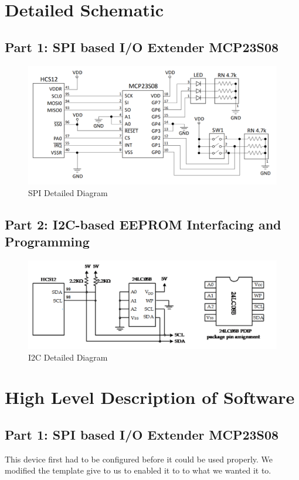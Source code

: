 \documentclass{article}
\begin{document}
	\section*{Detailed Schematic}
	\subsection*{Part 1: SPI based I/O Extender MCP23S08}
	\begin{figure}[H]
		\centering
		\includegraphics[scale=0.75]{SPI_SCH}
		\caption{SPI Detailed Diagram}
	\end{figure}
	\subsection*{Part 2: I2C-based EEPROM Interfacing and Programming}
	\begin{figure}[H]
		\centering
		\includegraphics[scale=0.75]{I2C_SCH}
		\caption{I2C Detailed Diagram}
	\end{figure}
	\section*{High Level Description of Software}
	\subsection*{Part 1: SPI based I/O Extender MCP23S08}
	This device first had to be configured before it could be used properly. We modified the template give to us to enabled it to to what we wanted it to.
\end{document}
